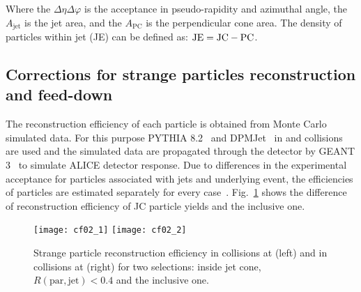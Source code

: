 \documentclass[ALICE,manyauthors]{cernphprep}
\begin{document}
Where the $\Delta\eta\Delta\varphi$ is the acceptance in pseudo-rapidity and azimuthal angle, the $A_\mathrm{jet}$ is the jet area, and the $A_\mathrm{PC}$ is the perpendicular cone area.
The density of particles within jet (JE) can be defined as:
${\rm JE = JC - PC}$.

\subsection{Corrections for strange particles reconstruction and feed-down}
\label{SubSec:Correction}
The reconstruction efficiency of each particle is obtained from Monte Carlo simulated data.
For this purpose PYTHIA 8.2~\cite{Sjostrand:2014zea} and DPMJet~\cite{Roesler:2000he} in \pp and \pPb collisions are used and the simulated data are propagated through the detector by GEANT 3~\cite{Brun:1994aa} to simulate ALICE detector response.
Due to differences in the experimental acceptance for particles associated with jets and underlying event, the efficiencies of particles are estimated separately for every case~\cite{Acharya:2021oaa}.
Fig.~\ref{fig:EffiJCIncl} shows the difference of reconstruction efficiency of JC particle yields and the inclusive one.
\begin{figure}[!ht]
	\begin{center}
		\texttt{[image: cf02\_1]}
		\texttt{[image: cf02\_2]}
	\end{center}
	\caption{Strange particle reconstruction efficiency in \pp collisions at \thirteen (left) and in \pPb collisions at \fivenn (right) for two selections: inside jet cone, $R(\mathrm{par, jet}) < 0.4$ and the inclusive one.}
	\label{fig:EffiJCIncl}
\end{figure}
\end{document}
